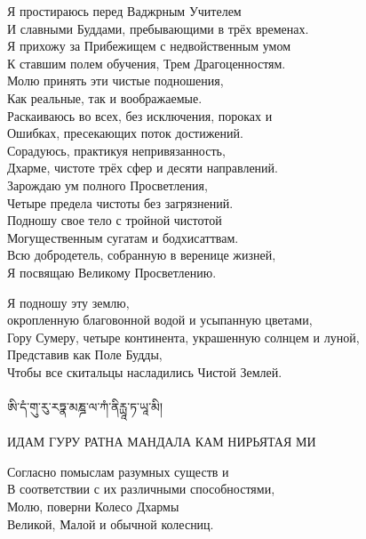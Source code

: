 

Я простираюсь перед Ваджрным Учителем\\
И славными Буддами, пребывающими в трёх временах.\\
Я прихожу за Прибежищем с недвойственным умом\\
К ставшим полем обучения, Трем Драгоценностям.\\
Молю принять эти чистые подношения,\\
Как реальные, так и воображаемые.\\
Раскаиваюсь во всех, без исключения, пороках и\\
Ошибках, пресекающих поток достижений.\\
Сорадуюсь, практикуя непривязанность,\\
Дхарме, чистоте трёх сфер и десяти направлений.\\
Зарождаю ум полного Просветления,\\
Четыре предела чистоты без загрязнений.\\
Подношу свое тело с тройной чистотой\\
Могущественным сугатам и бодхисаттвам.\\
Всю добродетель, собранную в веренице жизней,\\
Я посвящаю Великому Просветлению.
\newpage


Я подношу эту землю, \\
\indent окропленную благовонной водой и усыпанную цветами,\\
Гору Сумеру, четыре континента, украшенную солнцем и луной,\\
Представив как Поле Будды,\\
Чтобы все скитальцы насладились Чистой Землей.\\
\ti \\
ཨི་དཾ་གུ་རུ་རཏྣ་མཎྜ་ལ་ཀཾ་ནིརྻཱ་ཏ་ཡཱ་མི།\\
\ru \\ ИДАМ ГУРУ РАТНА МАНДАЛА КАМ НИРЬЯТАЯ МИ


Согласно помыслам разумных существ и\\
В соответствии с их различными способностями,\\
Молю, поверни Колесо Дхармы\\
Великой, Малой и обычной колесниц.
